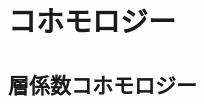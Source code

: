 \documentclass[TQFT_main]{subfiles}
\begin{document}



\chapter{コホモロジー}

\section{層係数コホモロジー}
\end{document}
